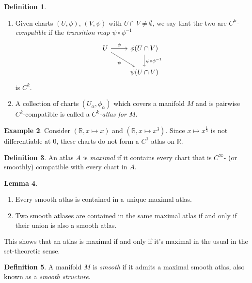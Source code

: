 \documentclass[10pt,letterpaper,cm]{nupset}
\theoremstyle{definition}
\newtheorem{definition}{Definition}[subsection]
\newtheorem{exmp}[definition]{Example}
\theoremstyle{theorem}
\newtheorem{lemma}[definition]{Lemma}
\theoremstyle{remark}
\newcommand{\R}{\mathbb R}
\newcommand{\1}{\mathbf{1}}
\newcommand{\0}{\vec 0}
\begin{document}
\begin{definition} $ $
\begin{enumerate}
\item 
Given charts $(U, \phi)$, $(V, \psi)$ with $U \cap V \ne \emptyset$, we say that the two are \textit{$C^k$-compatible} if the \textit{transition map $\psi \circ \phi^{-1}$}
 \[
  \begin{tikzcd}
    U \arrow{r}{\phi} \arrow[swap]{dr}{\psi} & \phi(U\cap V) \arrow{d}{\psi \circ \phi^{-1}} \\
     & \psi(U \cap V)
  \end{tikzcd}
\]
is $C^k$.
\item A collection of charts $(U_\alpha, \phi_\alpha)$ which covers a manifold $M$ and is pairwise $C^k$-compatible is called a \textit{$C^k$-atlas for $M$}.
\end{enumerate}
\end{definition}

\begin{exmp}
Consider $\left(\R, x \mapsto x\right)$ and $\left(\R, x \mapsto x^3\right)$. Since $x \mapsto x^{\frac{1}{3}}$ is not differentiable at $0$, these charts do not form a $C^1$-atlas on $\R$.
\end{exmp}


\begin{definition}{An atlas $A$ is \textit{maximal} if it contains every chart that is $C^{\infty}$- (or smoothly) compatible with every chart in $A$.}
\end{definition}

\begin{lemma}\label{l1} $ $


\begin{enumerate}
\item Every smooth atlas is contained in a unique maximal atlas.
\item Two smooth atlases are contained in the same maximal atlas  if and only if their union is also a smooth atlas.
\end{enumerate}

\end{lemma}



This shows that an atlas is maximal  if and only if it's maximal in the usual in the set-theoretic sense.

\theoremstyle{definition}
\begin{definition}{A manifold $M$ is \textit{smooth} if it admits a maximal smooth atlas, also known as a \textit{smooth structure}.}
\end{definition}
\end{document}
